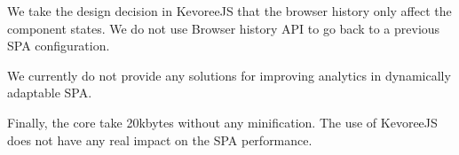 \begin{description}
\item We take the design decision in KevoreeJS that the browser history only affect the component states. We do not use Browser history API to go back to a previous SPA configuration. 

\item We currently do not provide any solutions for improving analytics in dynamically adaptable SPA.   

\item Finally, the core take 20kbytes without any minification. The use of KevoreeJS does not have any real impact on the SPA performance.

\end{description}
